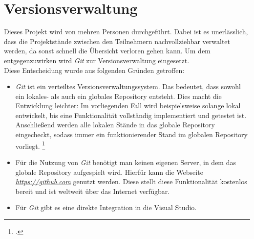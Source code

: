 \section{Versionsverwaltung}
\label{sec:versionsverwaltung}
Dieses Projekt wird von mehren Personen durchgeführt. Dabei ist es unerlässlich, dass die Projektstände zwischen den Teilnehmern nachvollziehbar verwaltet werden, da sonst schnell die Übersicht verloren gehen kann. Um dem entgegenzuwirken wird \textit{Git} zur Versionsverwaltung eingesetzt. \\
Diese Entscheidung wurde aus folgenden Gründen getroffen:
\begin{itemize}
\item \textit{Git} ist ein verteiltes Versionsverwaltungssystem. Das bedeutet, dass sowohl ein lokales- als auch ein globales Repository entsteht. Dies macht die Entwicklung leichter: Im vorliegenden Fall wird beispielsweise solange lokal entwickelt, bis eine Funktionalität vollständig implementiert und getestet ist. Anschließend werden alle lokalen Stände in das globale Repository eingecheckt, sodass immer ein funktionierender Stand im globalen Repository vorliegt. \footcite{online:definition-git}
\item Für die Nutzung von \textit{Git} benötigt man keinen eigenen Server, in dem das globale Repository aufgespielt wird. Hierfür kann die Webseite \href{https://github.com}{\textit{https://github.com}} genutzt werden. Diese stellt diese Funktionalität kostenlos bereit und ist weltweit über das Internet verfügbar. 
\item Für \textit{Git} gibt es eine direkte Integration in die \ac{Visual Studio}.
\end{itemize}